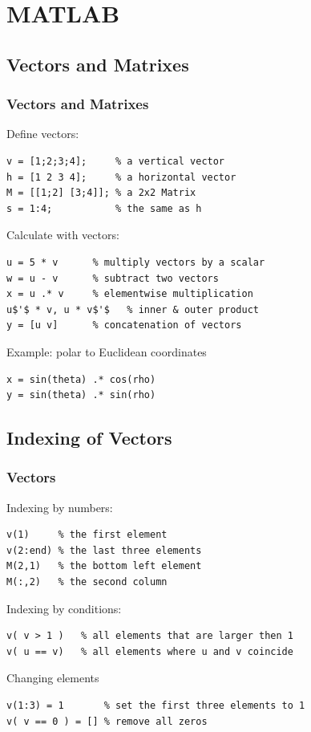 \section{MATLAB}

\subsection*{Vectors and Matrixes}


\begin{frame}[fragile]
  \frametitle{Vectors and Matrixes}

Define vectors:

\begin{lstlisting}
v = [1;2;3;4];     % a vertical vector
h = [1 2 3 4];     % a horizontal vector
M = [[1;2] [3;4]]; % a 2x2 Matrix
s = 1:4;           % the same as h
\end{lstlisting}

Calculate with vectors:
\begin{lstlisting}[mathescape=true]
u = 5 * v      % multiply vectors by a scalar
w = u - v      % subtract two vectors
x = u .* v     % elementwise multiplication
u$'$ * v, u * v$'$   % inner & outer product
y = [u v]      % concatenation of vectors
\end{lstlisting}

Example: polar to Euclidean coordinates
\begin{lstlisting}
x = sin(theta) .* cos(rho)
y = sin(theta) .* sin(rho)
\end{lstlisting}

\end{frame}

\subsection*{Indexing of Vectors}

\begin{frame}[fragile]
  \frametitle{Vectors}


Indexing by numbers:

\begin{lstlisting}
v(1)     % the first element
v(2:end) % the last three elements
M(2,1)   % the bottom left element
M(:,2)   % the second column
\end{lstlisting}

Indexing by conditions:

\begin{lstlisting}
v( v > 1 )   % all elements that are larger then 1
v( u == v)   % all elements where u and v coincide
\end{lstlisting}

Changing elements

\begin{lstlisting}
v(1:3) = 1       % set the first three elements to 1
v( v == 0 ) = [] % remove all zeros
\end{lstlisting}

\end{frame}

